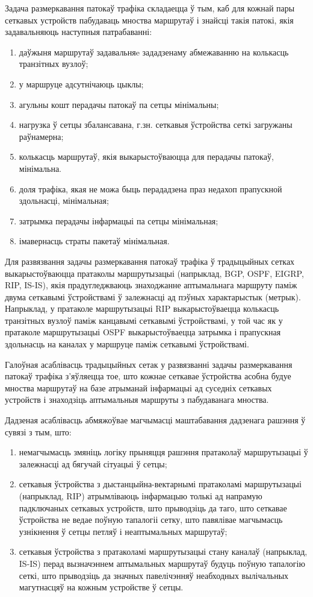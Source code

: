 Задача размеркавання патокаў трафіка складаецца ў тым, каб для кожнай пары сеткавых устройств пабудаваць мноства маршрутаў і знайсці такія патокі, якія задавальняюць наступныя патрабаванні:
\begin{enumerate}
    \item даўжыня маршрутаў задавальняe зададзенаму абмежаванню на колькасць транзітных вузлоў;
    \item у маршруце адсутнічаюць цыклы;
    \item агульны кошт перадачы патокаў па сетцы мінімальны;
    \item нагрузка ў сетцы збалансавана, г.зн. сеткавыя ўстройства сеткі загружаны раўнамерна;
    \item колькасць маршрутаў, якія выкарыстоўваюцца для перадачы патокаў, мінімальна.
    \item доля трафіка, якая не можа быць перададзена праз недахоп прапускной здольнасці, мінімальная;
    \item затрымка перадачы інфармацыі па сетцы мінімальная;
    \item імавернасць страты пакетаў мінімальная.
\end{enumerate}

Для развязвання задачы размеркавання патокаў трафіка ў традыцыйных сетках
выкарыстоўваюцца пратаколы маршрутызацыі (напрыклад, BGP, OSPF, EIGRP, RIP, IS-IS), якія прадугледжваюць знаходжанне аптымальнага маршруту паміж двума сеткавымі ўстройствамі ў залежнасці ад пэўных характарыстык (метрык).
Напрыклад, у пратаколе маршрутызацыі RIP выкарыстоўваецца колькасць транзітных вузлоў паміж канцавымі сеткавымі ўстройствамі, у той час як у
пратаколе маршрутызацыі OSPF выкарыстоўваецца затрымка і прапускная здольнасць на каналах у маршруце паміж сеткавымі ўстройствамі.

Галоўная асаблівасць традыцыйных сетак у развязванні задачы размеркавання патокаў трафіка
з'яўляецца тое, што кожнае сеткавае ўстройства асобна будуе мноства маршрутаў на базе атрыманай інфармацыі ад суседніх сеткавых устройств і
знаходзіць аптымальныя маршруты з пабудаванага мноства.

Дадзеная асаблівасць абмяжоўвае магчымасці маштабавання дадзенага рашэння ў
сувязі з тым, што:
\begin{enumerate}
    \item немагчымасць змяніць логіку прыняцця рашэння пратаколаў маршрутызацыі ў залежнасці ад
    бягучай сітуацыі ў сетцы;
    \item сеткавыя ўстройства з дыстанцыйна-вектарнымі пратаколамі маршрутызацыі (напрыклад, RIP)
    атрымліваюць інфармацыю толькі ад напрамую падключаных сеткавых устройств, што прыводзіць да таго, што сеткавае ўстройства
    не ведае поўную тапалогіі сетку, што павялівае магчымасць узнікнення
    ў сетцы петляў і неаптымальных маршрутаў;
    \item сеткавыя ўстройства з пратаколамі маршрутызацыі стану каналаў (напрыклад, IS-IS)
    перад вызначэннем аптымальных маршрутаў будуць поўную тапалогію сеткі,
    што прыводзіць да значных павелічэнняў неабходных вылічальных магутнасцяў на кожным устройстве ў сетцы.
\end{enumerate}

